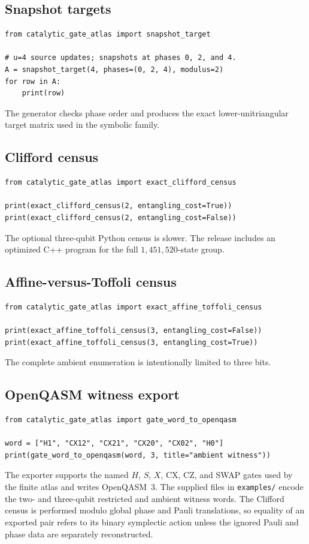 \subsection{Snapshot targets}
\begin{lstlisting}[style=pythonstyle]
from catalytic_gate_atlas import snapshot_target

# u=4 source updates; snapshots at phases 0, 2, and 4.
A = snapshot_target(4, phases=(0, 2, 4), modulus=2)
for row in A:
    print(row)
\end{lstlisting}
The generator checks phase order and produces the exact lower-unitriangular target matrix used in the symbolic family.

\subsection{Clifford census}
\begin{lstlisting}[style=pythonstyle]
from catalytic_gate_atlas import exact_clifford_census

print(exact_clifford_census(2, entangling_cost=True))
print(exact_clifford_census(2, entangling_cost=False))
\end{lstlisting}
The optional three-qubit Python census is slower.  The release includes an optimized C++ program for the full $1{,}451{,}520$-state group.

\subsection{Affine-versus-Toffoli census}
\begin{lstlisting}[style=pythonstyle]
from catalytic_gate_atlas import exact_affine_toffoli_census

print(exact_affine_toffoli_census(3, entangling_cost=False))
print(exact_affine_toffoli_census(3, entangling_cost=True))
\end{lstlisting}
The complete ambient enumeration is intentionally limited to three bits.

\subsection{OpenQASM witness export}
\begin{lstlisting}[style=pythonstyle]
from catalytic_gate_atlas import gate_word_to_openqasm

word = ["H1", "CX12", "CX21", "CX20", "CX02", "H0"]
print(gate_word_to_openqasm(word, 3, title="ambient witness"))
\end{lstlisting}
The exporter supports the named $H$, $S$, $X$, CX, CZ, and SWAP gates used by the finite atlas and writes OpenQASM~3.  The supplied files in \texttt{examples/} encode the two- and three-qubit restricted and ambient witness words.  The Clifford census is performed modulo global phase and Pauli translations, so equality of an exported pair refers to its binary symplectic action unless the ignored Pauli and phase data are separately reconstructed.

